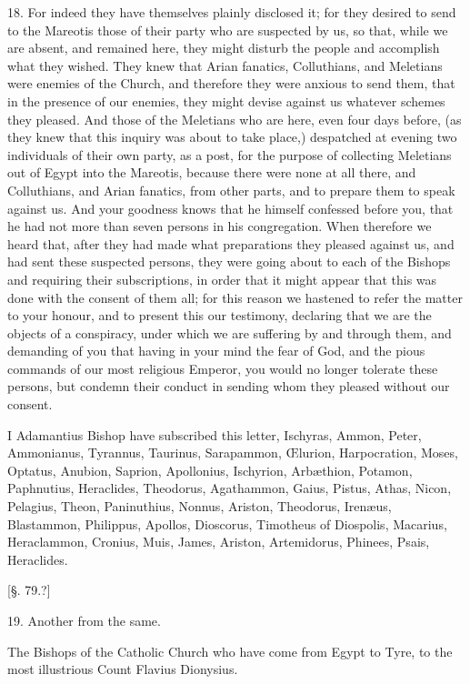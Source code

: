 18. For indeed they have themselves plainly
disclosed it; for they desired to send to the Mareotis those of their
party who are suspected by us, so that, while we are absent, and
remained here, they might disturb the people and accomplish what they
wished. They knew that Arian fanatics, Colluthians, and Meletians were
enemies of the Church, and therefore they were anxious to send them,
that in the presence of our enemies, they might devise against us
whatever schemes they pleased. And those of the Meletians who are
here, even four days before, (as they knew that this inquiry was about
to take place,) despatched at evening two individuals of their own
party, as a post, for the purpose of collecting Meletians out of Egypt
into the Mareotis, because there were none at all there, and
Colluthians, and Arian fanatics, from other parts, and to prepare them
to speak against us. And your goodness knows that he himself confessed before you, that he had not more than seven persons in his
congregation. When therefore we heard that, after they had made what
preparations they pleased against us, and had sent these suspected
persons, they were going about to each of the Bishops and requiring
their subscriptions, in order that it might appear that this was done
with the consent of them all; for this reason we hastened to refer the
matter to your honour, and to present this our testimony, declaring
that we are the objects of a conspiracy, under which we are suffering
by and through them, and demanding of you that having in your mind the
fear of God, and the pious commands of our most religious Emperor, you
would no longer tolerate these persons, but condemn their conduct in
sending whom they pleased without our consent.

I Adamantius Bishop have subscribed this letter,
Ischyras, Ammon, Peter, Ammonianus, Tyrannus, Taurinus, Sarapammon, Œlurion,
Harpocration, Moses, Optatus, Anubion, Saprion, Apollonius, Ischyrion,
Arbæthion, Potamon, Paphnutius, Heraclides, Theodorus, Agathammon,
Gaius, Pistus, Athas, Nicon, Pelagius, Theon, Paninuthius, Nonnus,
Ariston, Theodorus, Irenæus, Blastammon, Philippus, Apollos,
Dioscorus, Timotheus of Diospolis, Macarius, Heraclammon, Cronius,
Muis, James, Ariston, Artemidorus, Phinees, Psais, Heraclides.

[§. 79.?]

19. Another from the same.

The Bishops of the Catholic Church who have come
from Egypt to Tyre, to the most illustrious Count Flavius Dionysius.

